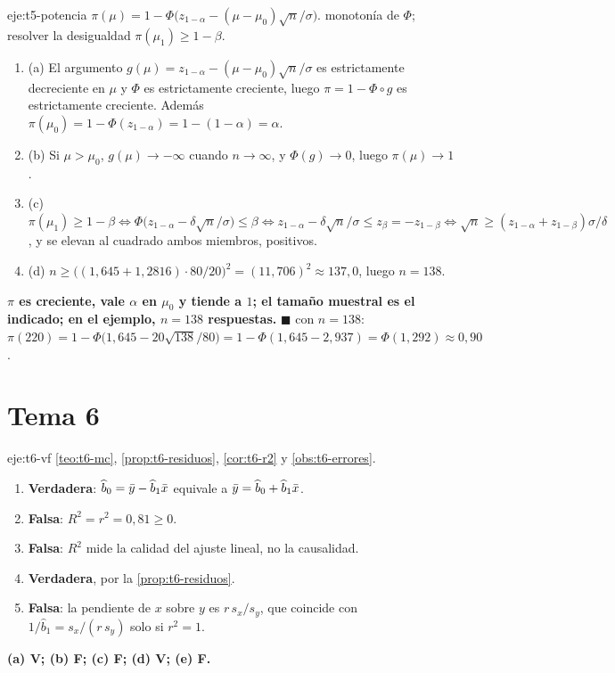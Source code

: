 \begin{solucion}{eje:t5-potencia}
\datos $\pi(\mu)=1-\Phi\bigl(z_{1-\alpha}-(\mu-\mu_0)\sqrt n/\sigma\bigr)$.
\planteamiento monotonía de $\Phi$; resolver la desigualdad $\pi(\mu_1)\ge1-\beta$.
\pasos
\begin{enumerate}[label=\arabic*.]
  \item (a) El argumento $g(\mu)=z_{1-\alpha}-(\mu-\mu_0)\sqrt n/\sigma$ es estrictamente decreciente en $\mu$ y $\Phi$ es estrictamente creciente, luego $\pi=1-\Phi\circ g$ es estrictamente creciente. Además $\pi(\mu_0)=1-\Phi(z_{1-\alpha})=1-(1-\alpha)=\alpha$.
  \item (b) Si $\mu>\mu_0$, $g(\mu)\to-\infty$ cuando $n\to\infty$, y $\Phi(g)\to0$, luego $\pi(\mu)\to1$.
  \item (c) $\pi(\mu_1)\ge1-\beta\iff\Phi\bigl(z_{1-\alpha}-\delta\sqrt n/\sigma\bigr)\le\beta\iff z_{1-\alpha}-\delta\sqrt n/\sigma\le z_\beta=-z_{1-\beta}\iff\sqrt n\ge(z_{1-\alpha}+z_{1-\beta})\sigma/\delta$, y se elevan al cuadrado ambos miembros, positivos.
  \item (d) $n\ge\bigl((1{,}645+1{,}2816)\cdot80/20\bigr)^{2}=(11{,}706)^{2}\approx137{,}0$, luego $n=138$.
\end{enumerate}
\resultado \textbf{$\pi$ es creciente, vale $\alpha$ en $\mu_0$ y tiende a $1$; el tamaño muestral es el indicado; en el ejemplo, $n=138$ respuestas.} $\blacksquare$
\comprobacion con $n=138$: $\pi(220)=1-\Phi\bigl(1{,}645-20\sqrt{138}/80\bigr)=1-\Phi(1{,}645-2{,}937)=\Phi(1{,}292)\approx0{,}90$.
\end{solucion}

\section{Tema 6}

\begin{solucion}{eje:t6-vf}
\planteamiento \cref{teo:t6-mc}, \cref{prop:t6-residuos}, \cref{cor:t6-r2} y \cref{obs:t6-errores}.
\pasos
\begin{enumerate}[label=(\alph*)]
  \item \textbf{Verdadera}: $\widehat b_0=\bar{y}-\widehat b_1\bar{x}$ equivale a $\bar{y}=\widehat b_0+\widehat b_1\bar{x}$.
  \item \textbf{Falsa}: $R^{2}=r^{2}=0{,}81\ge0$.
  \item \textbf{Falsa}: $R^{2}$ mide la calidad del ajuste lineal, no la causalidad.
  \item \textbf{Verdadera}, por la \cref{prop:t6-residuos}.
  \item \textbf{Falsa}: la pendiente de $x$ sobre $y$ es $r\,s_x/s_y$, que coincide con $1/\widehat b_1=s_x/(r\,s_y)$ solo si $r^{2}=1$.
\end{enumerate}
\resultado \textbf{(a) V; (b) F; (c) F; (d) V; (e) F.}
\end{solucion}

